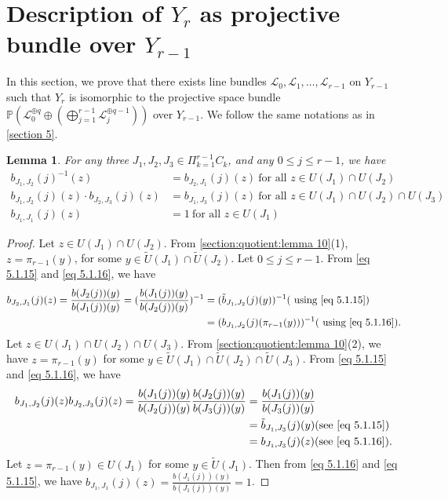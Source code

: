 \documentclass[12pt,reqno]{amsart}
\numberwithin{equation}{section}
\newtheorem{lemma}[theorem]{Lemma}
\theoremstyle{definition}
\begin{document}
		\section{Description of $Y_{r}$ as projective bundle over $Y_{r-1}$}
		In this section, we prove that there exists line bundles $\mathcal{L}_{0},\mathcal{L}_{1},\ldots,\mathcal{L}_{r-1}$ on $Y_{r-1}$ such that $Y_{r}$ is isomorphic to the projective space bundle $\mathbb{P}(\mathcal{L}_{0}^{\oplus q}\oplus(\bigoplus_{j=1}^{r-1} \mathcal{L}_{j}^{\oplus q-1}))$ over $Y_{r-1}$. We follow the same notations as in \cref{section 5}.
	\begin{lemma}\label{section:projective bundle:lemma 1}
		For any three $J_{1},J_{2},J_{3}\in  \Pi_{k=1}^{r-1}C_{k}$, and any $0\leq j\leq r-1$,  we have 
		\begin{align*}
			b_{J_{1},J_{2}}(j)^{-1}(z)&=b_{J_{2},J_{1}}(j)(z)\ \text{for all $z\in U(J_{1})\cap U(J_{2})$}\\
			b_{J_{1},J_{2}}(j)(z)\cdot b_{J_{2},J_{3}}(j)(z)&=b_{J_{1},J_{3}}(j)(z)\ \text{for all $z\in U(J_{1})\cap U(J_{2})\cap U(J_{3})$}\\
			b_{J_{1},J_{1}}(j)(z)&=1\ \text{for all $z\in U(J_{1})$}
		\end{align*}
	\end{lemma}
	\begin{proof} 
		Let $z\in U(J_{1})\cap U(J_{2})$. From \cref{section:quotient:lemma 10}(1), $z=\pi_{r-1}(y)$, for some  $y\in \tilde{U}(J_{1})\cap \tilde{U}(J_{2})$. Let $0\leq j\leq r-1$. From \cref{eq 5.1.15} and \cref{eq 5.1.16}, we have
		\begin{align*}
			b_{J_{2},J_{1}}(j)(z)=\frac{b(J_{2}(j))(y)}{b(J_{1}(j))(y)}
			=(\frac{b(J_{1}(j))(y)}{b(J_{2}(j))(y)})^{-1}
			&=(\tilde{b}_{J_{1},J_{2}}(j)(y))^{-1} (\text{\ using \cref{eq 5.1.15}})\\
			&=(b_{J_{1},J_{2}}(j)(\pi_{r-1}(y)))^{-1} (\text{\ using \cref{eq 5.1.16}}).
		\end{align*}
		Let $z\in U(J_{1})\cap U(J_{2})\cap U(J_{3})$. 
		From \cref{section:quotient:lemma 10}(2), we have $z=\pi_{r-1}(y)$ for some $y\in \tilde{U}(J_{1})\cap \tilde{U}(J_{2})\cap \tilde{U}(J_{3})$. From \cref{eq 5.1.15} and \cref{eq 5.1.16}, we have \begin{align*}
			b_{J_{1},J_{2}}(j)(z)b_{J_{2},J_{3}}(j)(z)=\frac{b(J_{1}(j))(y)}{b(J_{2}(j))(y)}\frac{b(J_{2}(j))(y)}{b(J_{3}(j))(y)}
			&=\frac{b(J_{1}(j))(y)}{b(J_{3}(j))(y)}\\
			&=\tilde{b}_{J_{1},J_{3}}(j)(y) \text{(see \cref{eq 5.1.15})}\\
			&=b_{J_{1},J_{3}}(j)(z) \text{(see \cref{eq 5.1.16})}.
		\end{align*}
	Let $z=\pi_{r-1}(y)\in U(J_{1})$ for some $y\in \tilde{U}(J_{1})$. Then from  \cref{eq 5.1.16} and \cref{eq 5.1.15}, we have $b_{J_{1},J_{1}}(j)(z)=\frac{b(J_{1}(j))(y)}{b(J_{1}(j))(y)}=1$.
	\end{proof}
\end{document}
